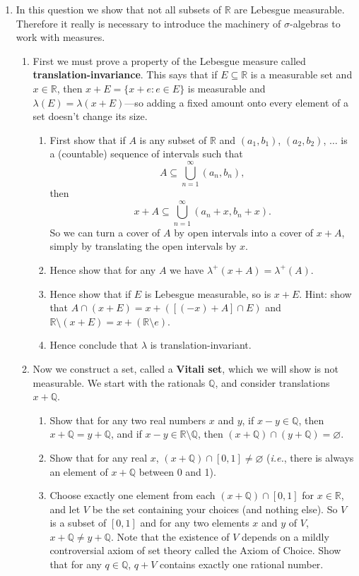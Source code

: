 \documentclass{article}
\let\take\setminus
\begin{document}
\begin{enumerate}
\begin{enumerate}
		\end{enumerate}
	\item In this question we show that not all subsets of $\mathbb{R}$ are Lebesgue measurable. Therefore it really is necessary to introduce the machinery of $\sigma$-algebras to work with measures.
		\begin{enumerate}
			\item First we must prove a property of the Lebesgue measure called \textbf{translation-invariance}. This says that if $E\subseteq \mathbb{R}$ is a measurable set and $x\in\mathbb{R}$, then $x+E=\{x+e : e\in E\}$ is measurable and $\lambda(E)=\lambda(x+E)$---so adding a fixed amount onto every element of a set doesn't change its size.
				\begin{enumerate}
					\item First show that if $A$ is any subset of $\mathbb{R}$ and $(a_1,b_1)$, $(a_2,b_2)$, $\hdots$ is a (countable) sequence of intervals such that
						\[A\subseteq \bigcup_{n=1}^\infty (a_n,b_n),\]
						then
						\[x+A\subseteq \bigcup_{n=1}^\infty (a_n+x,b_n+x).\]
						So we can turn a cover of $A$ by open intervals into a cover of $x+A$, simply by translating the open intervals by $x$.
					\item Hence show that for any $A$ we have $\lambda^+(x+A)=\lambda^+(A)$.
					\item Hence show that if $E$ is Lebesgue measurable, so is $x+E$. Hint: show that $A\cap(x+E)=x+([(-x)+A]\cap E)$ and $\mathbb{R}\take(x+E)=x+(\mathbb{R}\take e)$.
					\item Hence conclude that $\lambda$ is translation-invariant.
				\end{enumerate}
			\item Now we construct a set, called a \textbf{Vitali set}, which we will show is not measurable. We start with the rationals $\mathbb{Q}$, and consider translations $x+\mathbb{Q}$.
				\begin{enumerate}
					\item Show that for any two real numbers $x$ and $y$, if $x-y\in \mathbb{Q}$, then $x+\mathbb{Q}=y+\mathbb{Q}$, and if $x-y\in\mathbb{R}\take\mathbb{Q}$, then $(x+\mathbb{Q})\cap(y+\mathbb{Q})=\varnothing$.
					\item Show that for any real $x$, $(x+\mathbb{Q})\cap [0,1]\neq \varnothing$ (\textit{i.e.}, there is always an element of $x+\mathbb{Q}$ between 0 and 1).
					\item Choose exactly one element from each $(x+\mathbb{Q})\cap[0,1]$ for $x\in\mathbb{R}$, and let $V$ be the set containing your choices (and nothing else). So $V$ is a subset of $[0,1]$ and for any two elements $x$ and $y$ of $V$, $x+\mathbb{Q}\neq y+\mathbb{Q}$. Note that the existence of $V$ depends on a mildly controversial axiom of set theory called the Axiom of Choice. Show that for any $q\in\mathbb{Q}$, $q+V$ contains exactly one rational number.

\end{enumerate}
\end{enumerate}
\end{enumerate}
\end{document}
